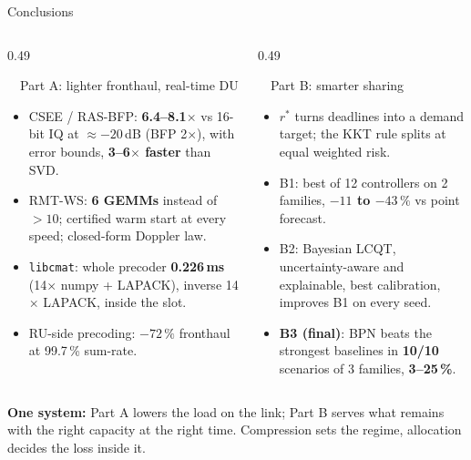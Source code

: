 \documentclass[aspectratio=169,10pt,xcolor={table,dvipsnames}]{beamer}
\newcommand{\rstar}{r^{\ast}}
\begin{document}
\begin{frame}{Conclusions}
\begin{columns}[T]
\begin{column}{0.49\textwidth}
\begin{block}{\ \ Part A: lighter fronthaul, real-time DU}
\footnotesize
\begin{itemize}
  \item CSEE / RAS-BFP: \textbf{6.4--8.1$\times$} vs 16-bit IQ at $\approx-20$\,dB (BFP 2$\times$), with error bounds, \textbf{3--6$\times$ faster} than SVD.
  \item RMT-WS: \textbf{6 GEMMs} instead of $>10$; certified warm start at every speed; closed-form Doppler law.
  \item \texttt{libcmat}: whole precoder \textbf{0.226\,ms} (14$\times$ numpy + LAPACK), inverse 14$\times$ LAPACK, inside the slot.
  \item RU-side precoding: \textbf{$-72\,\%$} fronthaul at 99.7\,\% sum-rate.
\end{itemize}
\end{block}
\end{column}
\begin{column}{0.49\textwidth}
\begin{block}{\faNetworkWired\ \ Part B: smarter sharing}
\footnotesize
\begin{itemize}
  \item $\rstar$ turns deadlines into a demand target; the KKT rule splits at equal weighted risk.
  \item B1: best of 12 controllers on 2 families, \textbf{$-11$ to $-43\,\%$} vs point forecast.
  \item B2: Bayesian LCQT, uncertainty-aware and explainable, best calibration, improves B1 on every seed.
  \item \textbf{B3 (final)}: BPN beats the strongest baselines in \textbf{10/10} scenarios of 3 families, \textbf{3--25\,\%}.
\end{itemize}
\end{block}
\end{column}
\end{columns}
\vspace{0.4em}
\begin{tcolorbox}[enhanced,colback=good!8,colframe=good,boxrule=0.6pt,arc=3pt,halign=center]
\small\textbf{One system:} Part A lowers the load on the link; Part B serves what remains with the right capacity at the right time. Compression sets the regime, allocation decides the loss inside it.
\end{tcolorbox}
\end{frame}
\end{document}
